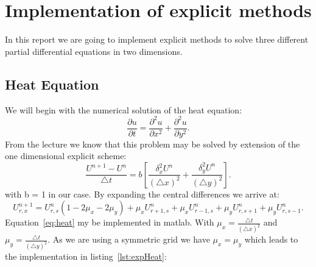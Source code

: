 


\maketitle

\section{Implementation of explicit methods}
In this report we are going to implement explicit methods to solve three different partial differential equations in two dimensions.
\subsection{Heat Equation}
We will begin with the numerical solution of the heat equation:
\begin{equation}
\frac{\partial u}{\partial t} = \frac{\partial^2 u}{\partial x^2} + \frac{\partial^2 u}{\partial y^2}.
\end{equation}
From the lecture we know that this problem may be solved by extension of the one dimensional explicit scheme:
\begin{equation}
\frac{U^{n+1}-U^{n}}{\triangle t} = b [\frac{\delta_x^2 U^n}{(\triangle x)^2} + \frac{\delta_y^2 U^n}{(\triangle y)^2} ].
\end{equation}
with b = 1 in our case. By expanding the central differences we arrive at:
\begin{equation}
U_{r,x}^{n+1} = U_{r,s}^n (1 - 2\mu_x - 2\mu_y) + \mu_x U_{r+1,s}^n + \mu_x U_{r-1,s}^n + \mu_y U_{r,s+1}^n + \mu_y U_{r,s-1}^n.
\label{eq:heat}
\end{equation}
Equation~\ref{eq:heat} my be implemented in matlab. With $\mu_x = \frac{\triangle t}{(\triangle x)^2}$ and $\mu_y = \frac{\triangle t}{(\triangle y)^2}$. As we are using a symmetric grid we have $\mu_x = \mu_y$ which leads to the implementation in listing~\ref{lst:expHeat}: 


